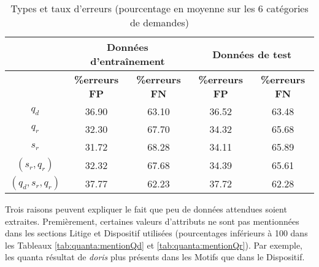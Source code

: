 \begin{table}[!htb]
	\centering\scriptsize
	\begin{tabular}{|c|c|c|c|c|}
		\hline
		      &    \multicolumn{2}{|c|}{Données d'entraînement}      &      \multicolumn{2}{|c|}{Données de test}       \\ \hline
		& \textbf{\%erreurs FP} & \textbf{\%erreurs FN} & \textbf{\%erreurs FP} & \textbf{\%erreurs FN} \\ \hline
		$q_d$            & 36.90                 & 63.10                 & 36.52                 & 63.48                 \\ \hline
		$q_r$            & 32.30                 & 67.70                 & 34.32                 & 65.68                 \\ \hline
		$s_r$            & 31.72                 & 68.28                 & 34.11                 & 65.89                 \\ \hline
		$(s_r, q_r)$     & 32.32                 & 67.68                 & 34.39                 & 65.61                 \\ \hline
		$(q_d,s_r, q_r)$ & 37.77                 & 62.23                 & 37.72                 & 62.28                 \\ \hline
	\end{tabular}
\caption{Types et taux d'erreurs (pourcentage en moyenne sur les 6 catégories de demandes)} \label{tab:quanta:types_erreurs}
\end{table}

Trois raisons peuvent expliquer le fait que  peu de données attendues soient extraites. Premièrement, certaines valeurs d'attributs ne sont pas mentionnées dans les sections Litige et Dispositif utilisées (pourcentages inférieurs à 100 dans les Tableaux \ref{tab:quanta:mentionQd} et \ref{tab:quanta:mentionQr}). Par exemple, les quanta résultat de \textit{doris} plus présents dans les Motifs que dans le Dispositif.

